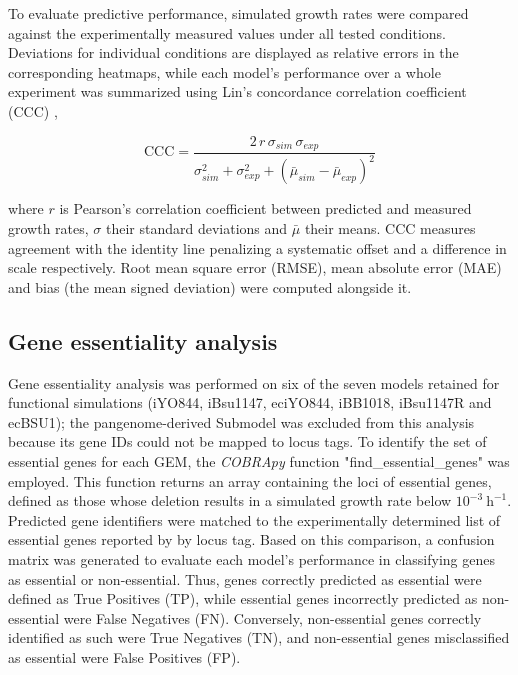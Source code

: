 \documentclass[11pt, a4paper]{article}
\begin{document}
To evaluate predictive performance, simulated growth rates were compared against the experimentally measured values under all tested conditions. Deviations for individual conditions are displayed as relative errors in the corresponding heatmaps, while each model's performance over a whole experiment was summarized using Lin's concordance correlation coefficient (CCC) \parencite{lin-1989},

\begin{equation}
\text{CCC} = \frac{2\,r\,\sigma_{sim}\,\sigma_{exp}}{\sigma_{sim}^{2} + \sigma_{exp}^{2} + (\bar{\mu}_{sim} - \bar{\mu}_{exp})^{2}}
\label{eq:ccc}
\end{equation}

where $r$ is Pearson's correlation coefficient between predicted and measured growth rates, $\sigma$ their standard deviations and $\bar{\mu}$ their means. CCC measures agreement with the identity line penalizing a systematic offset and a difference in scale respectively. Root mean square error (RMSE), mean absolute error (MAE) and bias (the mean signed deviation) were computed alongside it. 

\subsection{Gene essentiality analysis}
Gene essentiality analysis was performed on six of the seven models retained for functional simulations (iYO844, iBsu1147, eciYO844, iBB1018, iBsu1147R and ecBSU1); the pangenome-derived Submodel was excluded from this analysis because its gene IDs could not be mapped to locus tags.
To identify the set of essential genes for each GEM, the \textit{COBRApy} function "find\_essential\_genes" \parencite{ebrahim-2013} was employed.
This function returns an array containing the loci of essential genes, defined as those whose deletion results in a simulated growth rate below \(10^{-3}\ \mathrm{h}^{-1}\).
Predicted gene identifiers were matched to the experimentally determined list of essential genes reported by \parencite{kobayashi-2003} by locus tag. Based on this comparison, a confusion matrix was generated to evaluate each model’s performance in classifying genes as essential or non-essential.
Thus, genes correctly predicted as essential were defined as True Positives (TP), while essential genes incorrectly predicted as non-essential were False Negatives (FN). Conversely, non-essential genes correctly identified as such were True Negatives (TN), and non-essential genes misclassified as essential were False Positives (FP).
\end{document}
